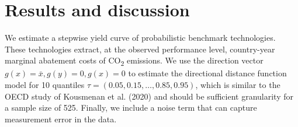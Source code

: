 \documentclass[
  10pt,
]{article}
\begin{document}
\hypertarget{results-and-discussion}{%
\section{Results and discussion}\label{results-and-discussion}}

We estimate a stepwise yield curve of probabilistic benchmark
technologies. These technologies extract, at the observed performance
level, country-year marginal abatement costs of CO\textsubscript{2}
emissions. We use the direction vector \(g(x)=\bar{x}, g(y)=0, g(x)=0\)
to estimate the directional distance function model for 10 quantiles
\(\tau=(0.05,0.15,\dots,0.85,0.95)\), which is similar to the OECD study of Kousmenan et al. (2020) and should be sufficient
granularity for a sample size of 525. Finally, we include a noise term
that can capture measurement error in the data.
\end{document}
